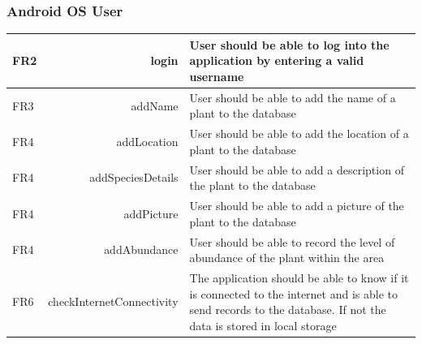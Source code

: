 	\subsubsection{Android OS User}
	\begin{tabular}{| l  r | p{10cm} |}
		\hline
		FR2 & login  & User should be able to log into the application by entering a valid username\\ \hline
		FR3 & addName  & User should be able to add the name of a plant to the database \\ \hline
		FR4 & addLocation  & User should be able to add the location of a plant to the database \\ \hline
		FR4 & addSpeciesDetails  & User should be able to add a description of the plant to the database \\ \hline
		FR4 & addPicture  & User should be able to add a picture of the plant to the database \\ \hline
		FR4 & addAbundance & User should be able to record the level of abundance of the plant within the area \\ \hline
		FR6 & checkInternetConnectivity  & The application should be able to know if it is connected to the internet and is able to send records to the database. If not the data is stored in local storage \\ \hline
	\end{tabular} \\


